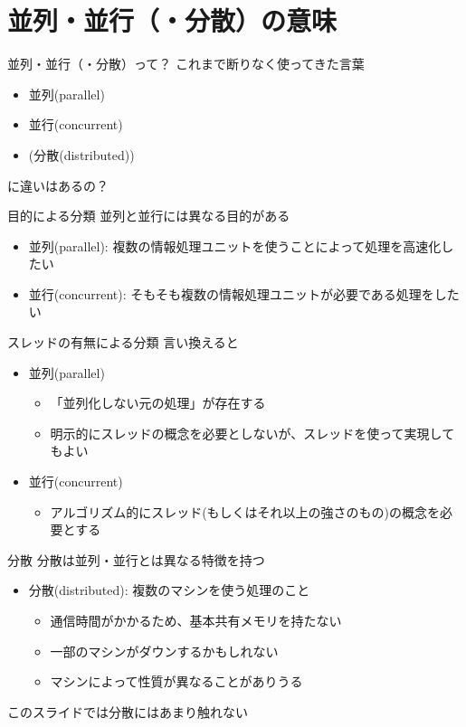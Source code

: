 \documentclass[unicode,12pt]{beamer}
\begin{document}
\section{並列・並行（・分散）の意味}

\begin{frame}{並列・並行（・分散）って？}
  これまで断りなく使ってきた言葉
  \begin{itemize}
  \item 並列(parallel)
  \item 並行(concurrent)
  \item (分散(distributed))
  \end{itemize}
  に違いはあるの？
\end{frame}

\begin{frame}{目的による分類}
  並列と並行には異なる目的がある
  \begin{itemize}
  \item 並列(parallel): 複数の情報処理ユニットを使うことによって処理を高速化したい
  \item 並行(concurrent): そもそも複数の情報処理ユニットが必要である処理をしたい
  \end{itemize}
\end{frame}

\begin{frame}{スレッドの有無による分類}
  言い換えると
  \begin{itemize}
  \item 並列(parallel)
    \begin{itemize}
    \item 「並列化しない元の処理」が存在する
    \item 明示的にスレッドの概念を必要としないが、スレッドを使って実現してもよい
    \end{itemize}
  \item 並行(concurrent)
    \begin{itemize}
    \item アルゴリズム的にスレッド(もしくはそれ以上の強さのもの)の概念を必要とする
    \end{itemize}
  \end{itemize}
\end{frame}

\begin{frame}{分散}
  分散は並列・並行とは異なる特徴を持つ
  \begin{itemize}
  \item 分散(distributed): 複数のマシンを使う処理のこと
    \begin{itemize}
    \item 通信時間がかかるため、基本共有メモリを持たない
    \item 一部のマシンがダウンするかもしれない
    \item マシンによって性質が異なることがありうる
    \end{itemize}
  \end{itemize}
  このスライドでは分散にはあまり触れない
\end{frame}
\end{document}
